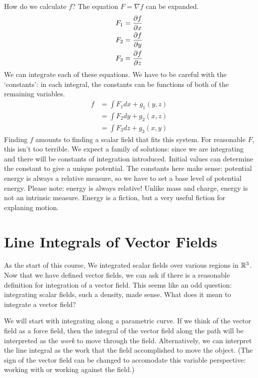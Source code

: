 \documentclass[fleqn,letterpaper]{report}
\begin{document}
How do we calculate $f$? The equation $F = \nabla f$ can be
expanded. 
\begin{align*}
F_1 & = \frac{\partial f}{\partial x} \\
F_2 & = \frac{\partial f}{\partial y} \\
F_3 & = \frac{\partial f}{\partial z} 
\end{align*}
We can integrate each of these equations. We have to be
careful with the `constants': in each integral, the constants
can be functions of both of the remaining variables. 
\begin{align*}
f & = \int F_1 dx + g_1(y,z) \\
& = \int F_2 dy + g_2(x,z) \\
& = \int F_3 dz + g_3(x,y) 
\end{align*}
Finding $f$ amounts to finding a scalar field that fits this
system. For reasonable $F$, this isn't too terrible. We
expect a family of solutions: since we are integrating and
there will be constants of integration introduced. Initial
values can determine the constant to give a unique potential.
The constants here make sense: potential energy is always a
relative measure, so we have to set a base level of potential
energy. Please note: energy is always relative! Unlike mass
and charge, energy is not an intrinsic measure. Energy is a
fiction, but a very useful fiction for explaning motion.

\section{Line Integrals of Vector Fields}
\label{line-integrals}

As the start of this course, We integrated scalar fields over
various regions in $\mathbb{R}^3$. Now that we have defined vector
fields, we can ask if there is a reasonable definition for
integration of a vector field. This seems like an odd
question: integrating scalar fields, such a density, made
sense. What does it mean to integrate a vector field?

We will start with integrating along a parametric curve.
If we think of the vector field as a force field, then the integral of
the vector field along the path will be interpreted as the
\emph{work} to move through the field. Alternatively, we can
interpret the line integral as the work that the field
accomplished to move the object. (The sign of the vector field
can be changed to accomodate this variable perspective:
working with or working against the field.)
\end{document}
